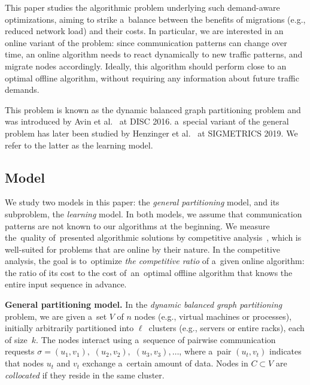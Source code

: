 \documentclass[a4paper,anonymous,USenglish]{lipics-v2019}
\begin{document}
This paper studies the algorithmic problem underlying such demand-aware
optimizations, aiming to strike a~balance between the benefits of migrations (e.g., reduced network load) and their costs.
In particular, we are interested in an online variant of the problem: since communication patterns can change over time, an online algorithm needs to react dynamically to new traffic patterns, and migrate nodes  accordingly.
Ideally, this algorithm should perform close to an optimal offline algorithm, without requiring any information about future traffic demands. 

This problem is known as the dynamic balanced graph partitioning problem and was introduced by Avin et al.~\cite{repartition-disc, sidma-arxiv} at DISC 2016. a~special variant of the general problem has later been studied by Henzinger et al.~\cite{sigmetrics19_partitioning} at SIGMETRICS 2019.
We refer to the latter as the learning model.



\subsection{Model}

We study two models in this paper: the \emph{general partitioning} model, and its subproblem, the \emph{learning} model.
In both models, we assume that communication patterns are not known to our algorithms at the beginning.
We measure the~quality of~presented algorithmic solutions by competitive analysis~\cite{borodin-book}, which is well-suited for problems that are online by their nature.
In the competitive analysis, the goal is to~optimize \emph{the competitive ratio} of a~given online algorithm: the ratio of its cost to the cost of~an~optimal offline algorithm that knows the entire input sequence in advance.

\noindent
\textbf{General partitioning model.}
In the \emph{dynamic balanced graph partitioning} problem, we are given a~set $V$ of $n$ nodes 
(e.g., virtual machines or processes),
initially arbitrarily partitioned into $\ell$~clusters
(e.g., servers or entire racks),
each of size~$k$.
The nodes interact using
a~sequence of pairwise communication requests
$\sigma = (u_1,v_1),$ $(u_2,v_2),$ $(u_3,v_3), \ldots$,
where a~pair $(u_t,v_t)$ indicates that nodes $u_t$ and $v_t$ exchange a~certain amount of data.
Nodes in $C \subset V$ are \emph{collocated}
if they reside in the same cluster.
\end{document}

